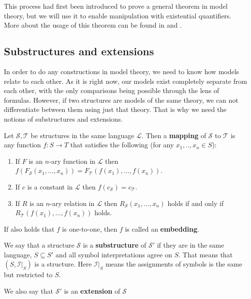 This process had first been introduced to prove a general theorem in model theory, but we will use it to enable manipulation with existential quantifiers. More about the usage of this theorem can be found in \cite{logic} and \cite{model}.

\subsection{Substructures and extensions}
\label{section:extensions}

In order to do any constructions in model theory, we need to know how models relate to each other. As it is right now, our models exist completely separate from each other, with the only comparisons being possible through the lens of formulas. However, if two structures are models of the same theory, we can not differentiate between them using just that theory. That is why we need the notions of substructures and extensions.

\begin{defn}
	Let $\mathcal{S},\mathcal{T}$ be structures in the same language $\mathcal{L}$. Then a \textbf{mapping} of $\mathcal{S}$ to $\mathcal{T}$ is any function $f:S\rightarrow T$ that satisfies the following (for any $x_1,..,x_n\in S$):
	\begin{enumerate}
		\item If $F$ is an $n$-ary function in $\mathcal{L}$ then $f(F_\mathcal{S}(x_1,\dots,x_n))=F_\mathcal{T}(f(x_1),\dots,f(x_n))$.
		\item If $c$ is a constant in $\mathcal{L}$ then $f(c_\mathcal{S})=c_\mathcal{T}$.
		\item If $R$ is an $n$-ary relation in $\mathcal{L}$ then $R_\mathcal{S}(x_1,\dots,x_n)$ holds if and only if $R_\mathcal{T}(f(x_1),\dots,f(x_n))$ holds.
	\end{enumerate}
If also holds that $f$ is one-to-one, then $f$ is called an \textbf{embedding}.
\end{defn}

\begin{defn}
	We say that a structure $\mathcal{S}$ is a \textbf{substructure} of $\mathcal{S}'$ if they are in the same language, $S\subseteq S'$ and all symbol interpretations agree on $S$. That means that $(S,\left.\mathcal{I}\right|_S)$ is a structure. Here $\left.\mathcal{I}\right|_S$ means the assignments of symbols is the same but restricted to $S$.
	
	We also say that $\mathcal{S}'$ is an \textbf{extension} of $\mathcal{S}$
\end{defn}

